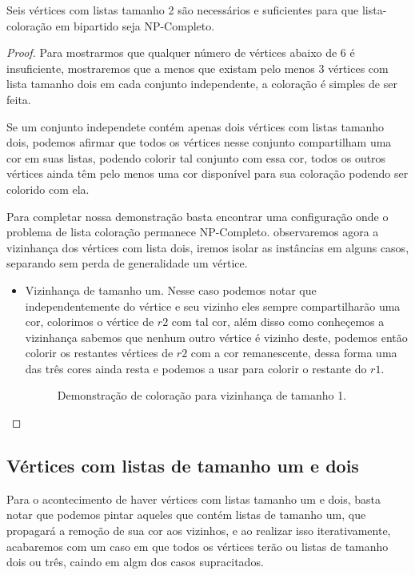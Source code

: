 \begin{teorema}
 Seis vértices com listas tamanho 2 são necessários e suficientes para que lista-coloração em bipartido seja NP-Completo.
\end{teorema}
\begin{proof}
 Para mostrarmos que qualquer número de vértices abaixo de 6 é insuficiente, mostraremos que a menos que existam pelo menos 3 vértices com lista tamanho dois em cada conjunto independente, a coloração é simples de ser feita. 
 
 Se um conjunto independete contém apenas dois vértices com listas tamanho dois, podemos afirmar que todos os vértices nesse conjunto compartilham uma cor em suas listas, podendo colorir tal conjunto com essa cor, todos os outros vértices ainda têm pelo menos uma cor disponível para sua coloração podendo ser colorido com ela.
 
 Para completar nossa demonstração basta encontrar uma configuração onde o problema de lista coloração permanece NP-Completo.
 observaremos agora a vizinhança dos vértices com lista dois, iremos isolar as instâncias em alguns casos, separando sem perda de generalidade um vértice.
 \begin{itemize}
   \item Vizinhança de tamanho um.
   Nesse caso podemos notar que independentemente do vértice e seu vizinho eles sempre compartilharão uma cor, colorimos o vértice de $r2$ com tal cor, além disso como conheçemos a vizinhança sabemos que nenhum outro vértice é vizinho deste, podemos então colorir os restantes vértices de $r2$ com a cor remanescente, dessa forma uma das três cores ainda resta e podemos a usar para colorir o restante do $r1$.
   \begin{figure}[H]
     \centering
     \fontsize{6}{10}
     
     \caption{Demonstração de coloração para vizinhança de tamanho 1.}
   \end{figure}
 \end{itemize}
\end{proof}

\subsection{Vértices com listas de tamanho um e dois}

Para o acontecimento de haver vértices com listas tamanho um e dois, basta notar que podemos pintar aqueles que contém listas de tamanho um, que propagará a remoção de sua cor aos vizinhos, e ao realizar isso iterativamente, acabaremos com um caso em que todos os vértices terão ou listas de tamanho dois ou três, caindo em algm dos casos supracitados.

